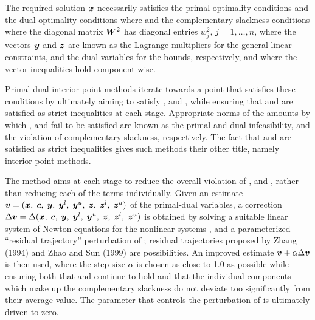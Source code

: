 \documentclass{galahad}
\begin{document}

\galmethod
The required solution ${\bm{x}}$ necessarily satisfies
the primal optimality conditions
and
the dual optimality conditions
where
and the complementary slackness conditions
where the diagonal matrix ${\bm{W}}^{2}$ has diagonal entries $w_{j}^{2}$,
$j = 1, \ldots , n$, where the vectors ${\bm{y}}$ and ${\bm{z}}$ are
known as the Lagrange multipliers for
the general linear constraints, and the dual variables for the bounds,
respectively, and where the vector inequalities hold component-wise.

Primal-dual interior point methods iterate towards a point
that satisfies these conditions by ultimately aiming to satisfy
,  and , while ensuring that
 and  are
satisfied as strict inequalities at each stage.
Appropriate norms of the amounts by
which ,  and  fail to be satisfied are known as the
primal and dual infeasibility, and the violation of complementary slackness,
respectively. The fact that  and  are satisfied as strict
inequalities gives such methods their other title, namely
interior-point methods.

The method aims at each stage to reduce the
overall violation of ,  and ,
rather than reducing each of the terms individually. Given an estimate
${\bm{v}} = ({\bm{x}}, \; {\bm{c}}, \; {\bm{y}}, \; {\bm{y}}^{l}, \;
{\bm{y}}^{u}, \; {\bm{z}}, \; {\bm{z}}^{l}, \; {\bm{z}}^{u})$
of the primal-dual variables, a correction
$\Delta {\bm{v}} = \Delta ({\bm{x}}, \; {\bm{c}}, \; {\bm{y}}, \; {\bm{y}}^{l},
 \; {\bm{y}}^{u} ,\;{\bm{z}},\;{\bm{z}}^{l} ,\;{\bm{z}}^{u} )$
is obtained by solving a suitable linear system of Newton equations for the
nonlinear systems ,  and a parameterized ``residual
trajectory'' perturbation of ; residual trajectories
proposed by Zhang (1994) and Zhao and Sun (1999) are possibilities.
An improved estimate ${\bm{v}} + \alpha \Delta {\bm{v}}$
is then used, where the step-size $\alpha$
is chosen as close to 1.0 as possible while ensuring both that
 and  continue to hold and that the individual components
which make up the complementary slackness
 do not deviate too significantly
from their average value. The parameter that controls the perturbation
of  is ultimately driven to zero.
\end{document}
